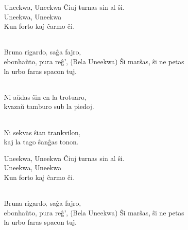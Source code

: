 \begin{lyrics}
Uneekwa, Uneekwa
Ĉiuj turnas sin al ŝi.\\
Uneekwa, Uneekwa\\
Kun forto kaj ĉarmo ĉi.

\\
Bruna rigardo, saĝa fajro,
\\
ebonhaŭto, pura reĝ’,
(Bela Uneekwa)
Ŝi marŝas, ŝi ne petas
\\
la urbo faras spacon tuj.

\\
Ni aŭdas ŝin en la trotuaro,\\
kvazaŭ tamburo sub la piedoj.

\\
Ni sekvas ŝian trankvilon,\\
kaj la tago ŝanĝas tonon.

Uneekwa, Uneekwa
Ĉiuj turnas sin al ŝi.\\
Uneekwa, Uneekwa\\
Kun forto kaj ĉarmo ĉi.

\\
Bruna rigardo, saĝa fajro,
\\
ebonhaŭto, pura reĝ’,
(Bela Uneekwa)
Ŝi marŝas, ŝi ne petas
\\
la urbo faras spacon tuj.
\end{lyrics}

